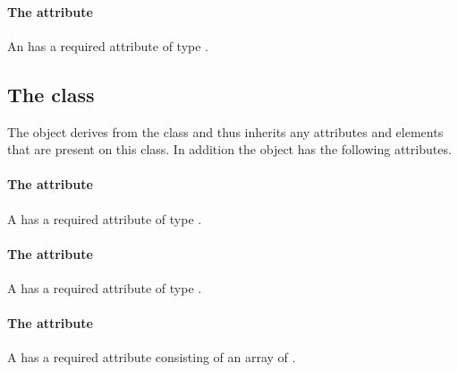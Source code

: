 \paragraph{The \fixttspace{} attribute}

An \OrdinalMapping has a required attribute  of type
.


\subsection{The  class}
\label{spatialpoints-class}




The \SpatialPoints object derives from the \SBase class and thus
inherits any attributes and elements that are present on this class.
In addition the \SpatialPoints object has the following attributes.

\paragraph{The \fixttspace{} attribute}

A \SpatialPoints has a required attribute  of type
.


\paragraph{The \fixttspace{} attribute}

A \SpatialPoints has a required attribute  of type
.


\paragraph{The \fixttspace{} attribute}

A \SpatialPoints has a required attribute  consisting
of an array of .


